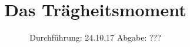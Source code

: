

\subject{V101}
\title{Das Trägheitsmoment}
\date{
  Durchführung: 24.10.17
  \hspace{3em}
  Abgabe: ???
}



\maketitle
\thispagestyle{empty}
\tableofcontents
\newpage







\newpage
\printbibliography


